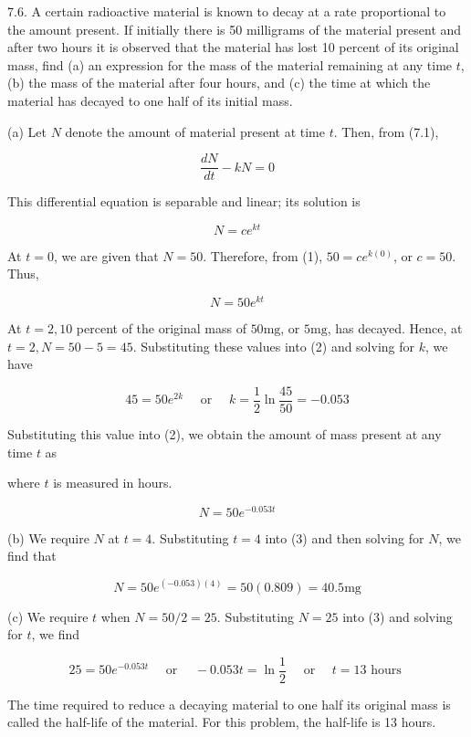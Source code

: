 \documentclass[10pt]{article}
\begin{document}
7.6. A certain radioactive material is known to decay at a rate proportional to the amount present. If initially there is 50 milligrams of the material present and after two hours it is observed that the material has lost 10 percent of its original mass, find (a) an expression for the mass of the material remaining at any time $t$, (b) the mass of the material after four hours, and (c) the time at which the material has decayed to one half of its initial mass.

(a) Let $N$ denote the amount of material present at time $t$. Then, from (7.1),

$$
\frac{d N}{d t}-k N=0
$$

This differential equation is separable and linear; its solution is


\begin{equation*}
N=c e^{k t} \tag{1}
\end{equation*}


At $t=0$, we are given that $N=50$. Therefore, from (1), $50=c e^{k(0)}$, or $c=50$. Thus,


\begin{equation*}
N=50 e^{k t} \tag{2}
\end{equation*}


At $t=2,10$ percent of the original mass of $50 \mathrm{mg}$, or $5 \mathrm{mg}$, has decayed. Hence, at $t=2, N=50-5=45$. Substituting these values into (2) and solving for $k$, we have

$$
45=50 e^{2 k} \quad \text { or } \quad k=\frac{1}{2} \ln \frac{45}{50}=-0.053
$$

Substituting this value into (2), we obtain the amount of mass present at any time $t$ as

where $t$ is measured in hours.


\begin{equation*}
N=50 e^{-0.053 t} \tag{3}
\end{equation*}


(b) We require $N$ at $t=4$. Substituting $t=4$ into (3) and then solving for $N$, we find that

$$
N=50 e^{(-0.053)(4)}=50(0.809)=40.5 \mathrm{mg}
$$

(c) We require $t$ when $N=50 / 2=25$. Substituting $N=25$ into (3) and solving for $t$, we find

$$
25=50 e^{-0.053 t} \quad \text { or } \quad-0.053 t=\ln \frac{1}{2} \quad \text { or } \quad t=13 \text { hours }
$$

The time required to reduce a decaying material to one half its original mass is called the half-life of the material. For this problem, the half-life is 13 hours.
\end{document}
